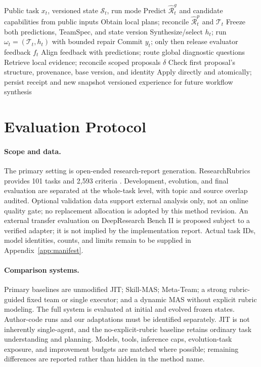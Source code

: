 \documentclass[11pt]{article}
\newcommand{\state}{\mathcal{S}}
\newcommand{\rub}{\widehat{\mathcal{R}}}
\newcommand{\team}{\mathcal{T}}
\begin{document}
\begin{algorithm}[t]
\caption{JIT-Compose: synthesize, execute, and retain}
\label{alg:cycle}
\small
\begin{algorithmic}[1]
\Require Public task $x_t$, versioned state $\state_t$, run mode
\State Predict $\rub_t^g$ and candidate capabilities from public inputs
\State Obtain local plans; reconcile $\rub_t^p$ and $\team_t$
\State Freeze both predictions, TeamSpec, and state version
\State Synthesize/select $h_t$; run $\omega_t=(\team_t,h_t)$ with bounded repair
\State Commit $y_t$; only then release evaluator feedback $f_t$
\State Align feedback with predictions; route global diagnostic questions
\State Retrieve local evidence; reconcile scoped proposals $\delta$
\State Check first proposal's structure, provenance, base version, and identity
\State Apply directly and atomically; persist receipt and new snapshot
\EndIf
\State \Return versioned experience for future workflow synthesis
\end{algorithmic}
\end{algorithm}

\section{Evaluation Protocol}
\label{sec:evaluation}

\paragraph{Scope and data.}
The primary setting is open-ended research-report generation. ResearchRubrics provides 101 tasks and 2,593 criteria \citep{sharma2025researchrubrics}. Development, evolution, and final evaluation are separated at the whole-task level, with topic and source overlap audited. Optional validation data support external analysis only, not an online quality gate; no replacement allocation is adopted by this method revision. An external transfer evaluation on DeepResearch Bench II \citep{li2026drbench2} is proposed subject to a verified adapter; it is not implied by the implementation report. Actual task IDs, model identities, counts, and limits remain to be supplied in Appendix~\ref{app:manifest}.

\paragraph{Comparison systems.}
Primary baselines are unmodified JIT; Skill-MAS; Meta-Team; a strong rubric-guided fixed team or single executor; and a dynamic MAS without explicit rubric modeling. The full system is evaluated at initial and evolved frozen states. Author-code runs and our adaptations must be identified separately. JIT is not inherently single-agent, and the no-explicit-rubric baseline retains ordinary task understanding and planning. Models, tools, inference caps, evolution-task exposure, and improvement budgets are matched where possible; remaining differences are reported rather than hidden in the method name.
\end{document}
